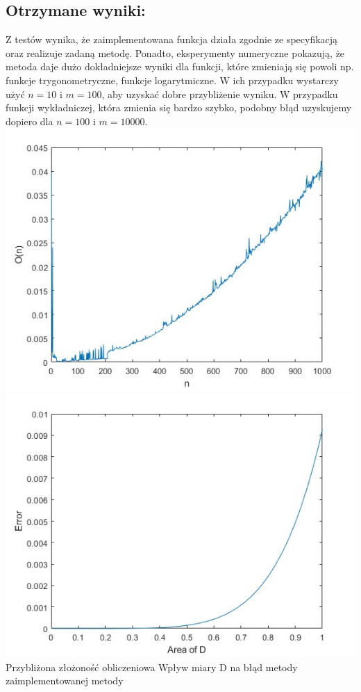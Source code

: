 \documentclass[12pt]{article}
\begin{document}
\subsection{Otrzymane wyniki:}
Z testów wynika, że zaimplementowana funkcja działa zgodnie ze specyfikacją oraz realizuje zadaną metodę. Ponadto, eksperymenty numeryczne pokazują, że metoda daje dużo dokładniejsze wyniki dla funkcji, które zmieniają się powoli np. funkcje trygonometryczne, funkcje logarytmiczne. W ich przypadku wystarczy użyć $n=10$ i $m=100$, aby uzyskać dobre przybliżenie wyniku. W przypadku funkcji wykładniczej, która zmienia się bardzo szybko, podobny błąd uzyskujemy dopiero dla $n=100$ i $m=10 000$. \\
\includegraphics[scale=0.4]{test4}        \includegraphics[scale=0.4]{test7} \\
Przybliżona złożoność obliczeniowa \quad \quad \quad \quad \quad \quad  Wpływ miary D na błąd metody \\ zaimplementowanej metody
\end{document}
